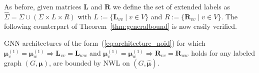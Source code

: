 As before, given matrices $\mathbf{L}$ and $\mathbf{R}$ we define the set of 
extended labels as $\hat{\Sigma}=\Sigma\cup (\Sigma\times L\times R)$ with
$L:=\{\mathbf{L}_{vv}\mid v\in V\}$ and $R:=\{\mathbf{R}_{vv}\mid v\in V\}$.
The following counterpart of Theorem~\ref{thm:generalbound} is now easily verified.

\begin{theorem}\label{thm:generalbound_noid}
GNN architectures of the form~(\ref{eq:architecture_noid}) for which 
	$\pmb{\mu}^{(1)}_v=\pmb{\mu}^{(1)}_w\Rightarrow  \mathbf{L}_{vv}=\mathbf{L}_{ww}$ and
$\pmb{\mu}^{(1)}_v=\pmb{\mu}^{(1)}_w\Rightarrow  \mathbf{R}_{vv}=\mathbf{R}_{ww}$  holds for any labeled graph  $(G,\pmb{\mu})$, are bounded by NWL on $(G,\hat{\pmb{\mu}})$.
\end{theorem}

